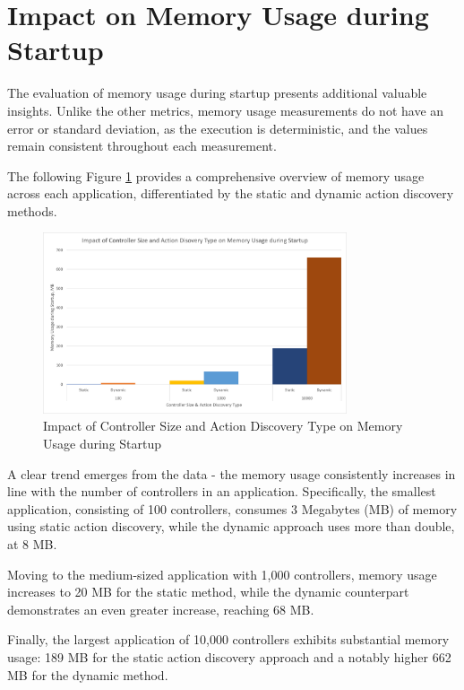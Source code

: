 \section{Impact on Memory Usage during Startup}

The evaluation of memory usage during startup presents additional valuable insights. Unlike the other metrics, memory usage measurements do not have an error or standard deviation, as the execution is deterministic, and the values remain consistent throughout each measurement.

The following Figure \ref{fig:memory-usage-results} provides a comprehensive overview of memory usage across each application, differentiated by the static and dynamic action discovery methods.

\begin{figure}[H]
\centering
\includegraphics[width=0.8\textwidth]{graphics/Impact of Controller Size and Action Discovery Type on Memory Usage during Startup.png}
\caption{Impact of Controller Size and Action Discovery Type on Memory Usage during Startup}
\label{fig:memory-usage-results}
\end{figure}

A clear trend emerges from the data - the memory usage consistently increases in line with the number of controllers in an application. Specifically, the smallest application, consisting of 100 controllers, consumes 3 Megabytes (MB) of memory using static action discovery, while the dynamic approach uses more than double, at 8 MB.

Moving to the medium-sized application with 1,000 controllers, memory usage increases to 20 MB for the static method, while the dynamic counterpart demonstrates an even greater increase, reaching 68 MB.

Finally, the largest application of 10,000 controllers exhibits substantial memory usage: 189 MB for the static action discovery approach and a notably higher 662 MB for the dynamic method.